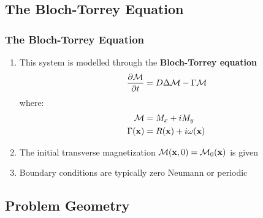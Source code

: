 \subsection{The Bloch-Torrey Equation}

\begin{frame}
\frametitle{The Bloch-Torrey Equation}
\begin{enumerate}
    \item This system is modelled through the \textbf{Bloch-Torrey equation}
    $$ \frac{\partial \mathcal{M}}{\partial t} = D \mbox{$\Delta$}{\mathcal{M}} - \Gamma \mathcal{M} $$
    where:
    \begin{align*}
        \mathcal{M} &= M_x + i M_y \\
        \Gamma(\mathbf{x}) &= R(\mathbf{x}) + i\omega(\mathbf{x})
    \end{align*}
    \item The initial transverse magnetization $\mathcal{M}(\mathbf{x},0) = \mathcal{M}_0(\mathbf{x})$ is given
    \item Boundary conditions are typically zero Neumann or periodic
\end{enumerate}
\end{frame}

\subsection{Problem Geometry}


